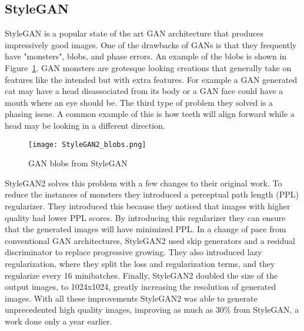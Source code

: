 %
%

\subsection{StyleGAN}
StyleGAN is a popular state of the art GAN architecture that produces
impressively good images. One of the drawbacks of GANs is that they frequently
have "monsters", blobs, and phase errors. An example of the blobs is shown in
Figure~\ref{fig:blobs}. GAN monsters are grotesque looking creations that
generally take on features like the intended but with extra features. For
example a GAN generated cat may have a head disassociated from its body or a GAN
face could have a mouth where an eye should be. The third type of problem they
solved is a phasing issue. A common example of this is how teeth will align
forward while a head may be looking in a different direction.

\begin{figure}[ht]
\centering
\texttt{[image: StyleGAN2\_blobs.png]}
\caption{GAN blobs from StyleGAN}
\label{fig:blobs}
\end{figure}

StyleGAN2 solves this problem with a few changes to their original work. To
reduce the instances of monsters they introduced a perceptual path length (PPL)
regularizer. They introduced this because they noticed that images with higher
quality had lower PPL scores. By introducing this regularizer they can ensure
that the generated images will have minimized PPL. In a change of pace from
conventional GAN architectures, StyleGAN2 used skip generators and a residual
discriminator to replace progressive growing. They also introduced lazy
regularization, where they split the loss and regularization terms, and they
regularize every 16 minibatches. Finally, StyleGAN2 doubled the size of the
output images, to 1024x1024, greatly increasing the resolution of generated
images. With all these improvements StyleGAN2 was able to generate unprecedented
high quality images, improving as much as 30\% from StyleGAN, a work done only a
year earlier. 
